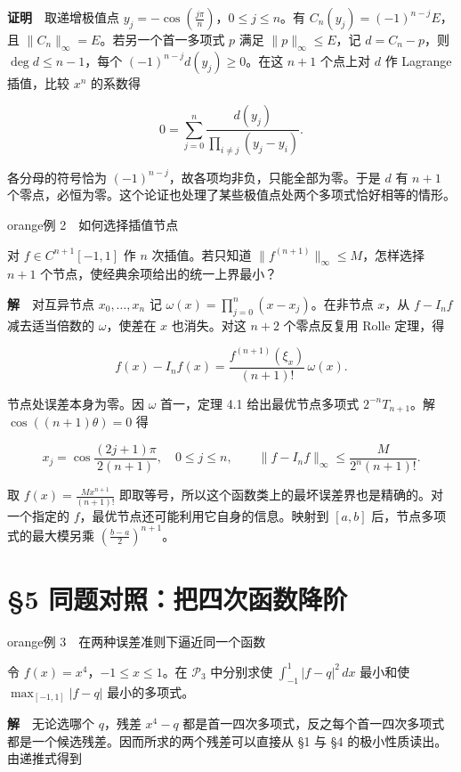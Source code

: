 \documentclass[11pt,a4paper]{article}
\newcommand{\lectureheading}[1]{\section{#1}}
\begin{document}
\textbf{证明}　取递增极值点 \(y_j=-\cos(\frac{j\pi}{n})\)，\(0\le j\le n\)。有 \(C_n(y_j)=(-1)^{n-j}E\)，且 \(\|C_n\|_\infty=E\)。若另一个首一多项式 \(p\) 满足 \(\|p\|_\infty\le E\)，记 \(d=C_n-p\)，则 \(\deg d\le n-1\)，每个 \((-1)^{n-j}d(y_j)\ge0\)。在这 \(n+1\) 个点上对 \(d\) 作 Lagrange 插值，比较 \(x^n\) 的系数得

\[
0=\sum_{j=0}^{n}\frac{d(y_j)}{\prod_{i\ne j}(y_j-y_i)} .
\]

各分母的符号恰为 \((-1)^{n-j}\)，故各项均非负，只能全部为零。于是 \(d\) 有 \(n+1\) 个零点，必恒为零。这个论证也处理了某些极值点处两个多项式恰好相等的情形。

\begin{sboxenv}{orange}{例 2　如何选择插值节点}

对 \(f\in C^{n+1}[-1,1]\) 作 \(n\) 次插值。若只知道 \(\|f^{(n+1)}\|_\infty\le M\)，怎样选择 \(n+1\) 个节点，使经典余项给出的统一上界最小？

\end{sboxenv}

\textbf{解}　对互异节点 \(x_0,\ldots,x_n\) 记 \(\omega(x)=\prod_{j=0}^n(x-x_j)\)。在非节点 \(x\)，从 \(f-I_nf\) 减去适当倍数的 \(\omega\)，使差在 \(x\) 也消失。对这 \(n+2\) 个零点反复用 Rolle 定理，得

\[
f(x)-I_nf(x)=\frac{f^{(n+1)}(\xi_x)}{(n+1)!}\,\omega(x).
\]

节点处误差本身为零。因 \(\omega\) 首一，定理 4.1 给出最优节点多项式 \(2^{-n}T_{n+1}\)。解 \(\cos((n+1)\theta)=0\) 得

\[
x_j=\cos\frac{(2j+1)\pi}{2(n+1)},\quad 0\le j\le n,\qquad
\|f-I_nf\|_\infty\le\frac{M}{2^n(n+1)!}.
\]

取 \(f(x)=\frac{Mx^{n+1}}{(n+1)!}\) 即取等号，所以这个函数类上的最坏误差界也是精确的。对一个指定的 \(f\)，最优节点还可能利用它自身的信息。映射到 \([a,b]\) 后，节点多项式的最大模另乘 \((\frac{b-a}{2})^{n+1}\)。

\clearpage\lectureheading{§5 同题对照：把四次函数降阶}

\begin{sboxenv}{orange}{例 3　在两种误差准则下逼近同一个函数}

令 \(f(x)=x^4\)，\(-1\le x\le1\)。在 \(\mathcal P_3\) 中分别求使 \(\int_{-1}^1|f-q|^2\,dx\) 最小和使 \(\max_{[-1,1]}|f-q|\) 最小的多项式。

\end{sboxenv}

\textbf{解}　无论选哪个 \(q\)，残差 \(x^4-q\) 都是首一四次多项式，反之每个首一四次多项式都是一个候选残差。因而所求的两个残差可以直接从 §1 与 §4 的极小性质读出。由递推式得到
\end{document}
